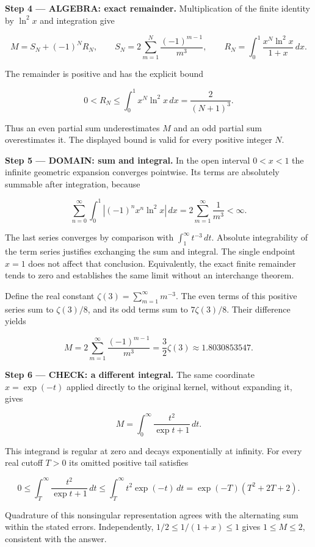 \documentclass[11pt,oneside,openany]{book}
\begin{document}
\begingroup\color{AlgebraBlue}
\textbf{Step 4 --- ALGEBRA: exact remainder.} Multiplication of the finite identity by \(\ln^2x\) and integration give

\[
M=S_N+(-1)^NR_N,\qquad
S_N=2\sum_{m=1}^N\frac{(-1)^{m-1}}{m^3},\qquad
R_N=\int_0^1\frac{x^N\ln^2x}{1+x}\,dx.
\]

The remainder is positive and has the explicit bound

\[
0<R_N\le\int_0^1x^N\ln^2x\,dx=\frac{2}{(N+1)^3}.
\]

Thus an even partial sum underestimates \(M\) and an odd partial sum overestimates it. The displayed bound is valid for every positive integer \(N\).

\endgroup
\begin{DomainStep}
\textbf{Step 5 --- DOMAIN: sum and integral.} In the open interval \(0<x<1\) the infinite geometric expansion converges pointwise. Its terms are absolutely summable after integration, because

\[
\sum_{n=0}^\infty\int_0^1|(-1)^nx^n\ln^2x|\,dx
=2\sum_{m=1}^\infty\frac1{m^3}<\infty.
\]

The last series converges by comparison with \(\int_1^\infty t^{-3}\,dt\). Absolute integrability of the term series justifies exchanging the sum and integral. The single endpoint \(x=1\) does not affect that conclusion. Equivalently, the exact finite remainder tends to zero and establishes the same limit without an interchange theorem.

Define the real constant \(\zeta(3)=\sum_{m=1}^\infty m^{-3}\). The even terms of this positive series sum to \(\zeta(3)/8\), and its odd terms sum to \(7\zeta(3)/8\). Their difference yields

\[
M=2\sum_{m=1}^\infty\frac{(-1)^{m-1}}{m^3}
=\frac32\zeta(3)\approx1.8030853547.
\]

\end{DomainStep}
\textbf{Step 6 --- CHECK: a different integral.} The same coordinate \(x=\exp(-t)\) applied directly to the original kernel, without expanding it, gives

\[
M=\int_0^\infty\frac{t^2}{\exp t+1}\,dt.
\]

This integrand is regular at zero and decays exponentially at infinity. For every real cutoff \(T>0\) its omitted positive tail satisfies

\[
0\le\int_T^\infty\frac{t^2}{\exp t+1}\,dt
\le\int_T^\infty t^2\exp(-t)\,dt
=\exp(-T)(T^2+2T+2).
\]

Quadrature of this nonsingular representation agrees with the alternating sum within the stated errors. Independently, \(1/2\le1/(1+x)\le1\) gives \(1\le M\le2\), consistent with the answer.
\end{document}
